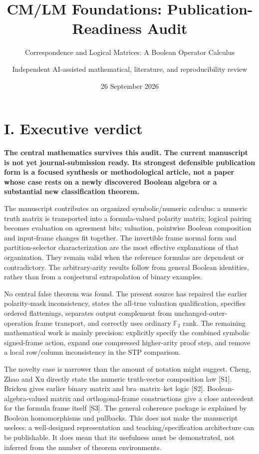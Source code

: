 \documentclass[
  10pt,
]{article}
\title{CM/LM Foundations: Publication-Readiness Audit}
\subtitle{Correspondence and Logical Matrices: A Boolean Operator
Calculus}
\author{Independent AI-assisted mathematical, literature, and
reproducibility review}
\date{26 September 2026}
\begin{document}
\maketitle

{
\hypersetup{linkcolor=}
\setcounter{tocdepth}{1}
\tableofcontents
}
\newpage

\section{I. Executive verdict}\label{i.-executive-verdict}

\textbf{The central mathematics survives this audit. The current
manuscript is not yet journal-submission ready. Its strongest defensible
publication form is a focused synthesis or methodological article, not a
paper whose case rests on a newly discovered Boolean algebra or a
substantial new classification theorem.}

The manuscript contributes an organized symbolic/numeric calculus: a
numeric truth matrix is transported into a formula-valued polarity
matrix; logical pairing becomes evaluation on agreement bits; valuation,
pointwise Boolean composition and input-frame changes fit together. The
invertible frame normal form and partition-selector characterization are
the most effective explanations of that organization. They remain valid
when the reference formulas are dependent or contradictory. The
arbitrary-arity results follow from general Boolean identities, rather
than from a conjectural extrapolation of binary examples.

No central false theorem was found. The present source has repaired the
earlier polarity-mask inconsistency, states the all-true valuation
qualification, specifies ordered flattenings, separates output
complement from unchanged-outer-operation frame transport, and correctly
uses ordinary \(\mathbb F_2\) rank. The remaining mathematical work is
mainly precision: explicitly specify the combined symbolic signed-frame
action, expand one compressed higher-arity proof step, and remove a
local row/column inconsistency in the STP comparison.

The novelty case is narrower than the amount of notation might suggest.
Cheng, Zhao and Xu directly state the numeric truth-vector composition
law {[}S1{]}. Bricken gives earlier binary matrix and bra--matrix--ket
logic {[}S2{]}. Boolean-algebra-valued matrix and orthogonal-frame
constructions give a close antecedent for the formula frame itself
{[}S3{]}. The general coherence package is explained by Boolean
homomorphisms and pullbacks. This does not make the manuscript useless:
a well-designed representation and teaching/specification architecture
can be publishable. It does mean that its usefulness must be
demonstrated, not inferred from the number of theorem environments.
\end{document}

